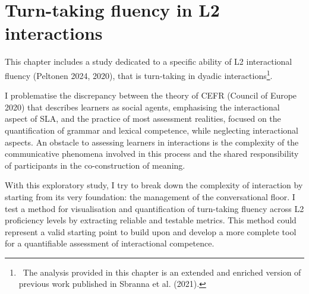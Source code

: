 \section{}
\section{Turn-taking fluency in L2 interactions}
\hypertarget{Toc191305923}{}\begin{styleStandard}
This chapter includes a study dedicated to a specific ability of L2 interactional fluency (Peltonen 2024, 2020), that is turn-taking in dyadic interactions\footnote{\ The analysis provided in this chapter is an extended and enriched version of previous work published in Sbranna et al. (2021).}. 
\end{styleStandard}

\begin{styleStandard}
I problematise the discrepancy between the theory of CEFR (Council of Europe 2020) that describes learners as social agents, emphasising the interactional aspect of SLA, and the practice of most assessment realities, focused on the quantification of grammar and lexical competence, while neglecting interactional aspects. An obstacle to assessing learners in interactions is the complexity of the communicative phenomena involved in this process and the shared responsibility of participants in the co-construction of meaning. 
\end{styleStandard}

\begin{styleStandard}
With this exploratory study, I try to break down the complexity of interaction by starting from its very foundation: the management of the conversational floor. I test a method for visualisation and quantification of turn-taking fluency across L2 proficiency levels by extracting reliable and testable metrics. This method could represent a valid starting point to build upon and develop a more complete tool for a quantifiable assessment of interactional competence.
\end{styleStandard}

